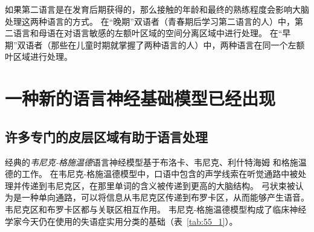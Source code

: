 如果第二语言是在发育后期获得的，那么接触的年龄和最终的熟练程度会影响大脑处理这两种语言的方式。
在“晚期”双语者（青春期后学习第二语言的人）中，第二语言和母语在对语言敏感的左额叶区域的空间分离区域中进行处理。
在“早期”双语者（那些在儿童时期就掌握了两种语言的人）中，两种语言在同一个左额叶区域进行处理。



\section{一种新的语言神经基础模型已经出现}

\subsection{许多专门的皮层区域有助于语言处理}

经典的\textit{韦尼克-格施温德}语言神经模型基于布洛卡\cite{broca1861remarques}、韦尼克\cite{wernicke1974aphasische}、利什特海姆\cite{lichtheim1885aphasia} 和格施温德\cite{geschwind1970organization}的工作。
在韦尼克-格施温德模型中，口语中包含的声学线索在听觉通路中被处理并传递到韦尼克区，在那里单词的含义被传递到更高的大脑结构。
弓状束被认为是一种单向通路，可以将信息从韦尼克区传递到布罗卡区，从而能够产生语音。
韦尼克区和布罗卡区都与关联区相互作用。
韦尼克-格施温德模型构成了临床神经学家今天仍在使用的失语症实用分类的基础（表~\ref{tab:55_1}）。


